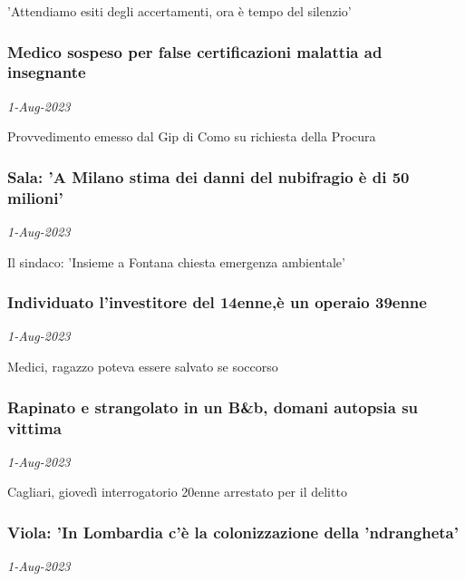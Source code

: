 'Attendiamo esiti degli accertamenti, ora \`{e} tempo del silenzio'
\subsubsection{Medico sospeso per false certificazioni malattia ad insegnante \href{https://www.ansa.it/sito/notizie/cronaca/2023/08/01/medico-sospeso-per-false-certificazioni-malattia-ad-insegnante_854b5c25-c303-4559-9b6d-23edb568e42a.html}{}}
\textit{1-Aug-2023}

Provvedimento emesso dal Gip di Como su richiesta della Procura
\subsubsection{Sala: 'A Milano stima dei danni del nubifragio \`{e} di 50 milioni' \href{https://www.ansa.it/sito/notizie/cronaca/2023/08/01/sala-a-milano-stima-dei-danni-del-nubifragio-e-di-50-milioni_b20581f1-7721-494a-9221-8f2eafc76adb.html}{}}
\textit{1-Aug-2023}

Il sindaco: 'Insieme a Fontana chiesta emergenza ambientale'
\subsubsection{Individuato l'investitore del 14enne,\`{e} un operaio 39enne \href{https://www.ansa.it/sito/notizie/cronaca/2023/08/01/individuato-linvestitore-del-14ennee-un-operaio-39enne_05e53787-88b7-4985-9f8b-3e03c117cff7.html}{}}
\textit{1-Aug-2023}

Medici, ragazzo poteva essere salvato se soccorso
\subsubsection{Rapinato e strangolato in un B\&b, domani autopsia su vittima \href{https://www.ansa.it/sito/notizie/cronaca/2023/08/01/rapinato-e-strangolato-in-un-bb-domani-autopsia-su-vittima_a59dd922-5beb-4d27-bf80-4140324c2b9d.html}{}}
\textit{1-Aug-2023}

Cagliari, gioved\`{i} interrogatorio 20enne arrestato per il delitto
\subsubsection{Viola: 'In Lombardia c'\`{e} la colonizzazione della 'ndrangheta' \href{https://www.ansa.it/sito/notizie/cronaca/2023/08/01/viola-in-lombardia-ce-la-colonizzazione-della-ndrangheta_b63f9b83-e2d2-42d2-8f23-13c0384d662a.html}{}}
\textit{1-Aug-2023}

